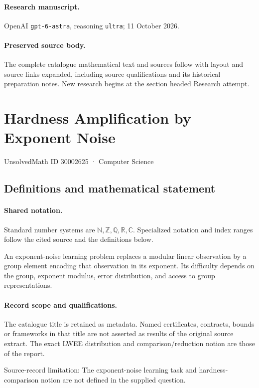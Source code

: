 \documentclass[11pt]{article}
\begin{document}
\paragraph{Research manuscript.} OpenAI \texttt{gpt-6-astra}, reasoning \texttt{ultra}; 11 October 2026.
\paragraph{Preserved source body.} The complete catalogue mathematical text and sources follow with layout and source links expanded, including source qualifications and its historical preparation notes. New research begins at the section headed Research attempt.

\section{Hardness Amplification by Exponent Noise}\label{30002625}
{\small UnsolvedMath ID 30002625 · Computer Science}
\subsection{Definitions and mathematical statement}

\paragraph{Shared notation.}Standard number systems are $\mathbb N,\mathbb Z,\mathbb Q,\mathbb R,\mathbb C$. Specialized notation and index ranges follow the cited source and the definitions below.


An exponent-noise learning problem replaces a modular linear observation by a group element encoding that observation in its exponent. Its difficulty depends on the group, exponent modulus, error distribution, and access to group representations.
\paragraph{Record scope and qualifications.}
The catalogue title is retained as metadata. Named certificates, contracts, bounds or frameworks in that title are not asserted as results of the original source extract.
The exact LWEE distribution and comparison/reduction notion are those of the report.

Source-record limitation: The exponent-noise learning task and hardness-comparison notion are not defined in the supplied question.
\end{document}
